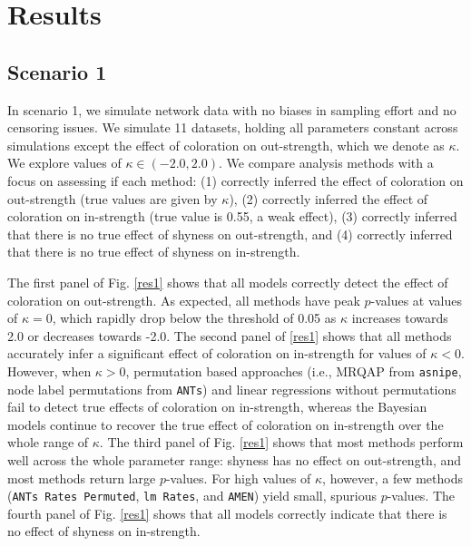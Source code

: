 \documentclass[Afour,sageh,times]{sagej}
\begin{document}
\section{Results}
\subsection{Scenario 1} 
In scenario 1, we simulate network data with no biases in sampling effort and no censoring issues. We simulate 11 datasets, holding all parameters constant across simulations except the effect of coloration on out-strength, which we denote as $\kappa$. We explore values of $\kappa \in (-2.0, 2.0)$. We compare analysis methods with a focus on assessing if each method: (1) correctly inferred the effect of coloration on out-strength (true values are given by $\kappa$), (2) correctly inferred the effect of coloration on in-strength (true value is 0.55,  a weak effect), (3) correctly inferred that there is no true effect of shyness on out-strength,  and (4) correctly inferred that there is no true effect of shyness on in-strength. %

The first panel of Fig. \ref{res1} shows that all models correctly detect the effect of coloration on out-strength. As expected, all methods have peak $p$-values at values of $\kappa=0$, which rapidly drop below the threshold of 0.05 as $\kappa$ increases towards 2.0 or decreases towards -2.0. The second panel of \ref{res1} shows that all methods accurately infer a significant effect of coloration on in-strength for values of $\kappa<0$. However, when $\kappa>0$, permutation based approaches (i.e., MRQAP from \texttt{asnipe}, node label permutations from \texttt{ANTs}) and linear regressions without permutations fail to detect true effects of coloration on in-strength, whereas the Bayesian models continue to recover the true effect of coloration on in-strength over the whole range of $\kappa$. The third panel of Fig. \ref{res1} shows that most methods perform well across the whole parameter range: shyness has no effect on out-strength, and most methods return large $p$-values. For high values of $\kappa$, however, a few methods (\texttt{ANTs Rates Permuted}, \texttt{lm Rates}, and \texttt{AMEN}) yield small, spurious $p$-values.  The fourth panel of Fig. \ref{res1} shows that all models correctly indicate that there is no effect of shyness on in-strength. 
\end{document}
